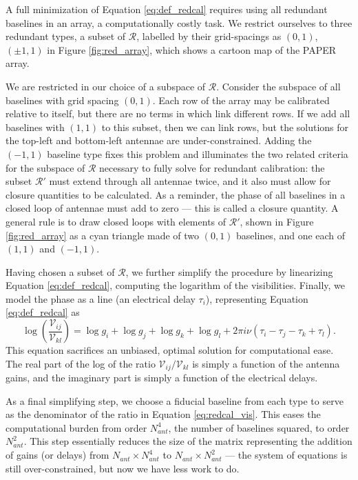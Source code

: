 A full minimization of Equation \ref{eq:def_redcal} requires using all redundant baselines in an
array, a computationally costly task. We restrict ourselves to three redundant types, a subset of
$\mathcal{R}$, labelled by their grid-spacings as $(0,1)$,$(\pm1,1)$ in Figure \ref{fig:red_array},
which shows a cartoon map of the PAPER array.

We are restricted in our choice of a subspace of $\mathcal{R}$. Consider the subspace of all
baselines with grid spacing $(0,1)$. Each row of the array may be calibrated relative to itself, but
there are no terms in \label{eq:def_redcal} which link different rows. If we add all baselines with
$(1,1)$ to this subset, then we can link rows, but the solutions for the top-left and bottom-left
antennae are under-constrained. Adding the $(-1,1)$ baseline type fixes this problem and illuminates
the two related criteria for the subspace of $\mathcal{R}$ necessary to fully solve for redundant
calibration: the subset $\mathcal{R}'$ must extend through all antennae twice, and it also must 
allow for closure quantities to be calculated. As a reminder, the phase of all baselines in a closed
loop of antennae must add to zero ---  this is called a closure quantity. A general rule is to draw
closed loops with elements of $\mathcal{R}'$, shown in Figure \ref{fig:red_array} as a cyan triangle
made of two $(0,1)$ baselines, and one each of $(1,1)$ and $(-1,1)$. 

Having chosen a subset of $\mathcal{R}$, we further simplify the procedure by linearizing Equation 
\ref{eq:def_redcal}, computing the logarithm of the visibilities. Finally, we model the phase as a 
line (an electrical delay $\tau_i$), representing Equation \ref{eq:def_redcal} as
\begin{equation}
  \log\left(\frac{\mathcal{V}_{ij}}{\mathcal{V}_{kl}}\right) 
  = 
  \log g_i + \log g_j + \log g_k + \log g_l 
  +
  2\pi i\nu(\tau_i-\tau_j-\tau_k+\tau_l).
  \label{eq:redcal_vis}
\end{equation}
This equation sacrifices an unbiased, optimal solution for computational ease. The real part of the
log of the ratio $\mathcal{V}_{ij}/\mathcal{V}_{kl}$ is simply a function of the antenna gains, and
the imaginary part is simply a function of the electrical delays.

As a final simplifying step, we choose a fiducial baseline from each type to serve as the denominator 
of the ratio in Equation \ref{eq:redcal_vis}. This eases the computational burden from order $N_{ant}^4$, the
number of baselines squared, to order $N_{ant}^2$. This step essentially reduces the size of the 
matrix representing the addition of gains (or delays) from $N_{ant}\times N_{ant}^4$ to 
$N_{ant}\times N_{ant}^2$ --- the system of equations is still over-constrained, but now we have
less work to do.


